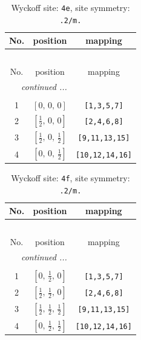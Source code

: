 \documentclass[fleqn,8pt]{jsarticle}
\begin{document}
\begin{longtable}{ccc}
\caption{Wyckoff site: {\tt 4e}, site symmetry: {\tt .2/m.}}
 \\
 \hline \hline
No. & position & mapping \\ \hline \endfirsthead

\multicolumn{2}{l}{\tablename\ \thetable{}} \\
 \hline \hline
No. & position & mapping \\ \hline \endhead

 \hline \hline
\multicolumn{2}{r}{\footnotesize\it continued ...} \\ \endfoot

 \hline \hline
\multicolumn{2}{r}{} \\ \endlastfoot

1 & $\left[ 0,\, 0,\, 0 \right]$ & {\tt [1,3,5,7]} \\ \hline
2 & $\left[ \frac{1}{2},\, 0,\, 0 \right]$ & {\tt [2,4,6,8]} \\ \hline
3 & $\left[ \frac{1}{2},\, 0,\, \frac{1}{2} \right]$ & {\tt [9,11,13,15]} \\ \hline
4 & $\left[ 0,\, 0,\, \frac{1}{2} \right]$ & {\tt [10,12,14,16]} \\
\end{longtable}
\renewcommand{\arraystretch}{1.2}
\begin{longtable}{ccc}
\caption{Wyckoff site: {\tt 4f}, site symmetry: {\tt .2/m.}}
 \\
 \hline \hline
No. & position & mapping \\ \hline \endfirsthead

\multicolumn{2}{l}{\tablename\ \thetable{}} \\
 \hline \hline
No. & position & mapping \\ \hline \endhead

 \hline \hline
\multicolumn{2}{r}{\footnotesize\it continued ...} \\ \endfoot

 \hline \hline
\multicolumn{2}{r}{} \\ \endlastfoot

1 & $\left[ 0,\, \frac{1}{2},\, 0 \right]$ & {\tt [1,3,5,7]} \\ \hline
2 & $\left[ \frac{1}{2},\, \frac{1}{2},\, 0 \right]$ & {\tt [2,4,6,8]} \\ \hline
3 & $\left[ \frac{1}{2},\, \frac{1}{2},\, \frac{1}{2} \right]$ & {\tt [9,11,13,15]} \\ \hline
4 & $\left[ 0,\, \frac{1}{2},\, \frac{1}{2} \right]$ & {\tt [10,12,14,16]} \\
\end{longtable}
\end{document}
